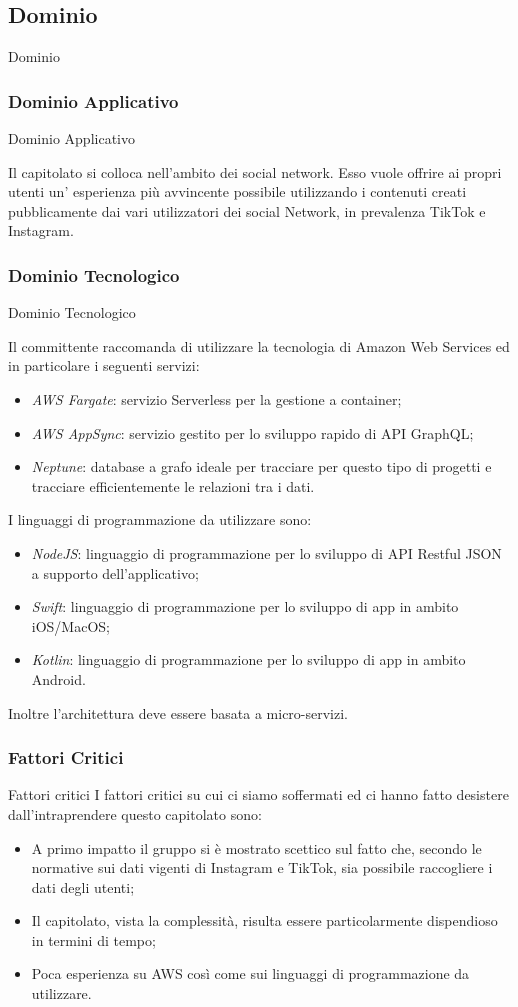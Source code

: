 \documentclass[11pt]{article}
\begin{document}
    \subsection{Dominio} Dominio
        \subsubsection{Dominio Applicativo} Dominio Applicativo
        
        Il capitolato si colloca nell'ambito dei social network.
        Esso vuole offrire ai propri utenti un' esperienza più avvincente possibile utilizzando i contenuti creati pubblicamente dai vari utilizzatori dei social Network, in prevalenza TikTok e Instagram.
        \subsubsection{Dominio Tecnologico} Dominio Tecnologico
        
        Il committente raccomanda di utilizzare la tecnologia di Amazon Web Services ed in particolare i seguenti servizi:
		\begin{itemize}
			\item \textit{AWS Fargate}: servizio Serverless per la gestione a container;
			\item \textit{AWS AppSync}: servizio gestito per lo sviluppo rapido di API GraphQL;
			\item \textit{Neptune}: database a grafo ideale per tracciare per questo tipo di progetti e tracciare efficientemente le relazioni tra i dati.
		\end{itemize}
		I linguaggi di programmazione da utilizzare sono:
		\begin{itemize}
			\item \textit{NodeJS}: linguaggio di programmazione per lo sviluppo di API Restful JSON a supporto dell’applicativo;
			\item \textit{Swift}: linguaggio di programmazione per lo sviluppo di app in ambito iOS/MacOS;
			\item \textit{Kotlin}: linguaggio di programmazione per lo sviluppo di app in ambito Android.
		\end{itemize}
		Inoltre l’architettura deve essere basata a micro-servizi.
    
    \subsubsection{Fattori Critici} Fattori critici
    I fattori critici su cui ci siamo soffermati ed ci hanno fatto desistere dall'intraprendere questo capitolato sono:
    \begin{itemize}
            \item A primo impatto il gruppo si è mostrato scettico sul fatto che, secondo le normative sui dati vigenti di Instagram e TikTok, sia possibile raccogliere i dati degli utenti;
			\item Il capitolato, vista la complessità, risulta essere particolarmente dispendioso in termini di tempo;
			\item Poca esperienza su AWS così come sui linguaggi di programmazione da utilizzare.
        \end{itemize}
\end{document}
